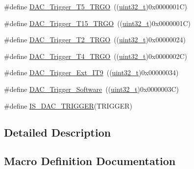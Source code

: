 \begin{DoxyCompactItemize}
\item 
\#define \hyperlink{group___d_a_c__trigger__selection_ga35352cebfd1ae8a3d63e374a5d86a85d}{D\+A\+C\+\_\+\+Trigger\+\_\+\+T5\+\_\+\+T\+R\+GO}~((\hyperlink{_p_e___types_8h_a33594304e786b158f3fb30289278f5af}{uint32\+\_\+t})0x0000001\+C)
\item 
\#define \hyperlink{group___d_a_c__trigger__selection_ga9f738c0c1366a588ac4fa9e060278c70}{D\+A\+C\+\_\+\+Trigger\+\_\+\+T15\+\_\+\+T\+R\+GO}~((\hyperlink{_p_e___types_8h_a33594304e786b158f3fb30289278f5af}{uint32\+\_\+t})0x0000001\+C)
\item 
\#define \hyperlink{group___d_a_c__trigger__selection_ga3bfbff1e03af1fd17a57a43e57420fe6}{D\+A\+C\+\_\+\+Trigger\+\_\+\+T2\+\_\+\+T\+R\+GO}~((\hyperlink{_p_e___types_8h_a33594304e786b158f3fb30289278f5af}{uint32\+\_\+t})0x00000024)
\item 
\#define \hyperlink{group___d_a_c__trigger__selection_ga58ccb2de3d22d66ee975152f5edb330a}{D\+A\+C\+\_\+\+Trigger\+\_\+\+T4\+\_\+\+T\+R\+GO}~((\hyperlink{_p_e___types_8h_a33594304e786b158f3fb30289278f5af}{uint32\+\_\+t})0x0000002\+C)
\item 
\#define \hyperlink{group___d_a_c__trigger__selection_ga67c15b2c26246a2304f9db28e25adcc4}{D\+A\+C\+\_\+\+Trigger\+\_\+\+Ext\+\_\+\+I\+T9}~((\hyperlink{_p_e___types_8h_a33594304e786b158f3fb30289278f5af}{uint32\+\_\+t})0x00000034)
\item 
\#define \hyperlink{group___d_a_c__trigger__selection_gadef77bb8bbd109232900902402ef637f}{D\+A\+C\+\_\+\+Trigger\+\_\+\+Software}~((\hyperlink{_p_e___types_8h_a33594304e786b158f3fb30289278f5af}{uint32\+\_\+t})0x0000003\+C)
\item 
\#define \hyperlink{group___d_a_c__trigger__selection_ga4409b79639e6ae3b1f0ed61a33c810a3}{I\+S\+\_\+\+D\+A\+C\+\_\+\+T\+R\+I\+G\+G\+ER}(T\+R\+I\+G\+G\+ER)
\end{DoxyCompactItemize}


\subsection{Detailed Description}


\subsection{Macro Definition Documentation}
